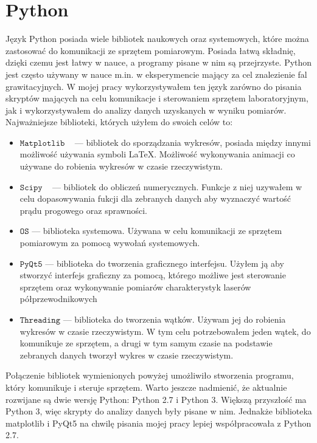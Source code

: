 \section{Python}
Język Python posiada wiele bibliotek naukowych oraz systemowych, które można zastosować do komunikacji ze sprzętem pomiarowym.
Posiada łatwą składnię, dzięki czemu jest łatwy w nauce, a programy pisane w nim są przejrzyste.
Python jest często używany w nauce m.in. w eksperymencie mający za cel znalezienie fal grawitacyjnych.
W mojej pracy wykorzystywałem ten język zarówno do pisania skryptów mających na celu komunikacje i sterowaniem sprzętem laboratoryjnym,
jak i wykorzystywałem do analizy danych uzyskanych w wyniku pomiarów.
Najważniejsze biblioteki, których użyłem do swoich celów to:
\begin{itemize}
\item $\mathtt{Matplotlib}$ ~\cite{matplotlib_book} --- bibliotek do sporządzania wykresów, posiada między innymi możliwość używania symboli \LaTeX.
Możliwość wykonywania animacji co używane do robienia wykresów w czasie rzeczywistym.
\item $\mathtt{Scipy}$ ~\cite{SciPy_book} --- bibliotek do obliczeń numerycznych. Funkcje z niej uzywałem w celu dopasowywania
fukcji dla zebranych danych aby wyznaczyć wartość prądu progowego oraz sprawności.
\item $\mathtt{OS}$ --- biblioteka systemowa. Używana w celu komunikacji ze sprzętem pomiarowym za pomocą wywołań systemowych.
\item $\mathtt{PyQt5}$ --- biblioteka do tworzenia graficznego interfejsu. Użyłem ją aby stworzyć interfejs graficzny za pomocą,
którego możliwe jest sterowanie sprzętem oraz wykonywanie pomiarów charakterystyk laserów półprzewodnikowych
\item $\mathtt{Threading}$ --- biblioteka do tworzenia wątków. Używam jej do robienia wykresów w czasie rzeczywistym.
W tym celu potrzebowałem jeden wątek, do komunikuje ze sprzętem, a drugi w tym samym czasie
na podstawie zebranych danych tworzył wykres w czasie rzeczywistym.
\end{itemize}
Połączenie bibliotek wymienionych powyżej umożliwiło stworzenia programu, który komunikuje i steruje sprzętem.
Warto jeszcze nadmienić, że aktualnie rozwijane są dwie wersję Python: Python 2.7 i Python 3. Większą przyszłość ma Python 3,
więc skrypty do analizy danych były pisane w nim. Jednakże biblioteka matplotlib i PyQt5 na chwilę pisania mojej
pracy lepiej współpracowała z Python 2.7.
